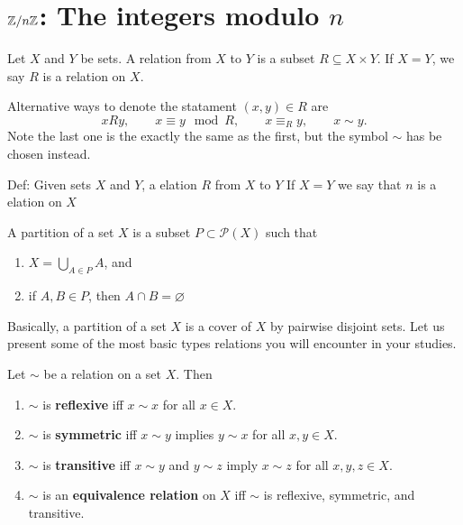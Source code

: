 \documentclass[11pt,a4paper]{article}
\begin{document}
\def\contador{Lesson 1}


\section[]{\(\mathbb{Z}/ n\mathbb{Z}\): The integers modulo \(n\)}

\begin{defi}
    Let $X$ and $Y$ be sets.
    A relation from \(X\) to \(Y\) is a subset $R \subseteq X {\times} Y$.
    If \(X= Y\), we say \(R\) is a relation on \(X\).
\end{defi}

Alternative ways to denote the statament \((x,y)\in R\) are 
\[x R y,\qquad x\equiv y\! \mod R,\qquad x\equiv_R y,\qquad x\sim y .\]
Note the  last one is the exactly the same as the first, but the symbol \(\sim\) has be chosen instead. 



Def: Given sets $X$ and $Y$, a elation $R$ from $X$ to $Y$  If $X=Y$ we say that $n$ is a elation on $X$



\begin{defi}
    A partition of a set \(X\) is a subset \(P\subset \mathcal{P}(X)\) such that 
    \begin{enumerate}[label=(\roman*)]
        \item \(X = \bigcup_{A\in P} A\), and 
        \item if \(A,B\in P\), then \(A\cap B = \varnothing\)
    \end{enumerate}
\end{defi}

Basically, a partition of a set \(X\) is a cover of \(X\) by pairwise disjoint sets.
Let us present some of the most basic types  relations you will encounter in your studies.

\begin{defi}
    Let \(\sim\) be a relation on a set \(X\).
    Then 
    \begin{enumerate}[label=(\roman*)]
        \item \(\sim\) is \textbf{reflexive} iff \(x\sim x\) for all \(x\in X\).
        \item \(\sim\) is \textbf{symmetric} iff \(x\sim y\) implies \(y\sim x\) for all \(x,y\in X\).
        \item \(\sim\) is \textbf{transitive} iff \(x\sim y\) and \(y\sim z\) imply \(x\sim z\) for all \(x,y,z\in X\).
        \item \(\sim\) is an  \textbf{equivalence relation} on \(X\) iff \(\sim\) is reflexive, symmetric, and transitive.
    \end{enumerate}
\end{defi}
\end{document}
